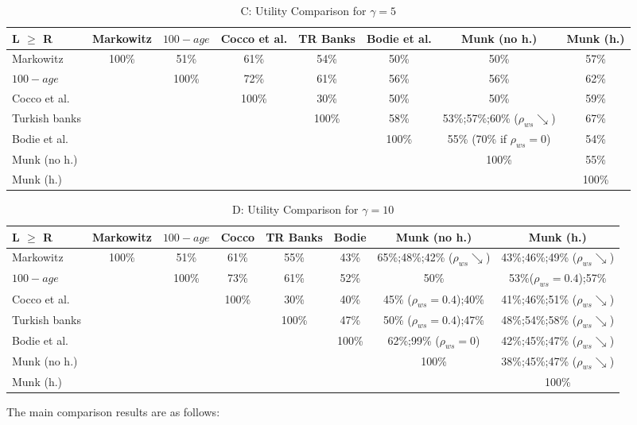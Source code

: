 \begin{table}[h!]\ContinuedFloat
	\centering
	\caption{C: Utility Comparison for $\gamma=5$}
	\label{table:compareutils}
	\begin{tabular}[c]{|l|ccccccc|}
		\hline
		L $\geq$ R			&Markowitz&$100-age$&Cocco et al.&TR Banks&Bodie et al.&Munk (no h.)&Munk (h.)\\
		\hline
Markowitz					&100\%&51\%&61\%&54\%&50\%&50\%&57\%\\
$100-age$					&&100\%&72\%&61\%&56\%&56\%&62\%\\
Cocco et al.				&&&100\%&30\%&50\%&50\%&59\%\\
Turkish banks			 	&&&&100\%&58\%&53\%;57\%;60\% ($\rho_{ws}\searrow$)&67\%\\
Bodie et al.			 	&&&&&100\%&55\% (70\% if $\rho_{ws}=0$)&54\%\\
Munk (no h.)				&&&&&&100\%&55\%\\
Munk (h.)					&&&&&&&100\%\\
	\hline
	\end{tabular}
\end{table}
\begin{table}[h!]\ContinuedFloat
	\centering
	\caption{D: Utility Comparison for $\gamma=10$}
	\label{table:compareutils}
	\begin{tabular}[c]{|l|ccccccc|}
		\hline
		L $\geq$ R			&Markowitz&$100-age$&Cocco&TR Banks&Bodie&Munk (no h.)&Munk (h.)\\
		\hline
Markowitz					&100\%&51\%&61\%&55\%&43\%&65\%;48\%;42\% ($\rho_{ws}\searrow$)&43\%;46\%;49\% ($\rho_{ws}\searrow$)\\
$100-age$					&&100\%&73\%&61\%&52\%&50\%&53\%($\rho_{ws}=0.4$);57\%\\
Cocco et al.				&&&100\%&30\%&40\%&45\% ($\rho_{ws}=0.4$);40\%&41\%;46\%;51\% ($\rho_{ws}\searrow$)\\
Turkish banks			 	&&&&100\%&47\%&50\% ($\rho_{ws}=0.4$);47\%&48\%;54\%;58\% ($\rho_{ws}\searrow$)\\
Bodie et al.			 	&&&&&100\%&62\%;99\% ($\rho_{ws}=0$)&42\%;45\%;47\% ($\rho_{ws}\searrow$)\\
Munk (no h.)				&&&&&&100\%&38\%;45\%;47\% ($\rho_{ws} \searrow$)\\
Munk (h.)					&&&&&&&100\%\\
	\hline
	\end{tabular}
\end{table}


\restoregeometry

The main comparison results are as follows:

